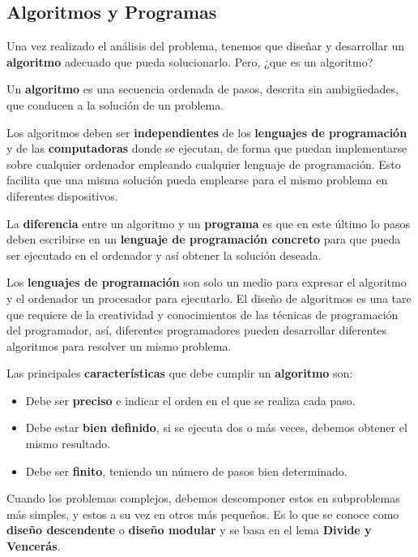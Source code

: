 \subsection{Algoritmos y Programas}
Una vez realizado el análisis del problema, tenemos que diseñar y desarrollar un \textbf{algoritmo} adecuado que pueda solucionarlo. Pero, ¿que es un algoritmo?

Un \textbf{algoritmo} es una secuencia ordenada de pasos, descrita sin ambigüedades, que conducen a la solución de un problema.

Los algoritmos deben ser \textbf{independientes} de los \textbf{lenguajes de programación} y de las \textbf{computadoras} donde se ejecutan, de forma que puedan implementarse sobre cualquier ordenador empleando cualquier lenguaje de programación. Esto facilita que una misma solución pueda emplearse para el mismo problema en diferentes dispositivos.

La \textbf{diferencia} entre un algoritmo y un \textbf{programa} es que en este último lo pasos deben escribirse en un \textbf{lenguaje de programación concreto} para que pueda ser ejecutado en el ordenador y así obtener la solución deseada.

Los \textbf{lenguajes de programación} son solo un medio para expresar el algoritmo y el ordenador un procesador para ejecutarlo. El diseño de algoritmos es una tare que requiere de la creatividad y conocimientos de las técnicas de programación del programador, así, diferentes programadores pueden desarrollar diferentes algoritmos para resolver un mismo problema.

Las principales \textbf{características} que debe cumplir un \textbf{algoritmo} son:

\begin{itemize}
    \item Debe ser \textbf{preciso} e indicar el orden en el que se realiza cada paso.
    \item Debe estar \textbf{bien definido}, si se ejecuta dos o más veces, debemos obtener el mismo resultado.
    \item Debe ser \textbf{finito}, teniendo un número de pasos bien determinado.
\end{itemize}

Cuando los problemas complejos, debemos descomponer estos en subproblemas más simples, y estos a su vez en otros más pequeños. Es lo que se conoce como \textbf{diseño descendente} o \textbf{diseño modular} y se basa en el lema \textbf{Divide y Vencerás}.

